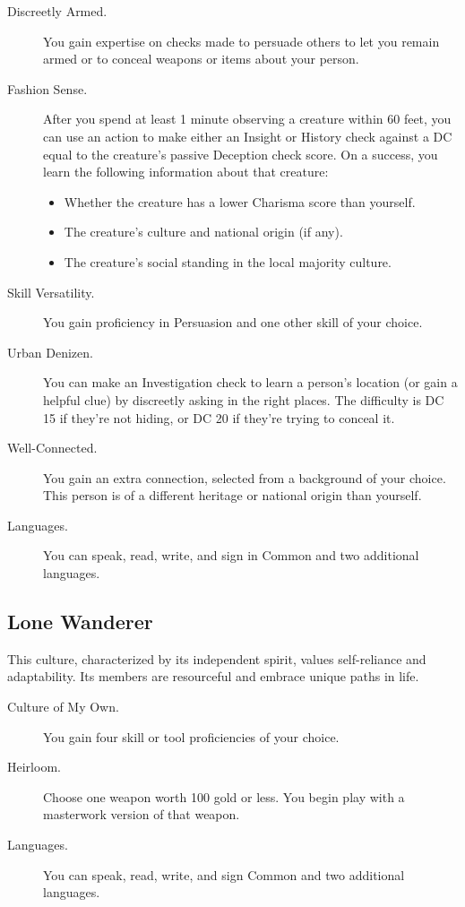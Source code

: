 \begin{description}
\item[Discreetly Armed.]
You gain expertise on checks made to persuade others to let you remain
armed or to conceal weapons or items about your person.
\item[Fashion Sense.]
After you spend at least 1 minute observing a creature within 60 feet,
you can use an action to make either an Insight or History check against
a DC equal to the creature's passive Deception check score. On a
success, you learn the following information about that creature:

\begin{itemize}
\item
  Whether the creature has a lower Charisma score than yourself.
\item
  The creature's culture and national origin (if any).
\item
  The creature's social standing in the local majority culture.
\end{itemize}
\item[Skill Versatility.]
You gain proficiency in Persuasion and one other skill of your choice.
\item[Urban Denizen.]
You can make an Investigation check to learn a person's location (or
gain a helpful clue) by discreetly asking in the right places. The
difficulty is DC 15 if they're not hiding, or DC 20 if they're trying to
conceal it.
\item[Well-Connected.]
You gain an extra connection, selected from a background of your choice.
This person is of a different heritage or national origin than yourself.
\item[Languages.]
You can speak, read, write, and sign in Common and two additional
languages.
\end{description}

\subsection{Lone Wanderer}\label{_lone_wanderer}

This culture, characterized by its independent spirit, values
self-reliance and adaptability. Its members are resourceful and embrace
unique paths in life.

\begin{description}
\item[Culture of My Own.]
You gain four skill or tool proficiencies of your choice.
\item[Heirloom.]
Choose one weapon worth 100 gold or less. You begin play with a
masterwork version of that weapon.
\item[Languages.]
You can speak, read, write, and sign Common and two additional
languages.
\end{description}

